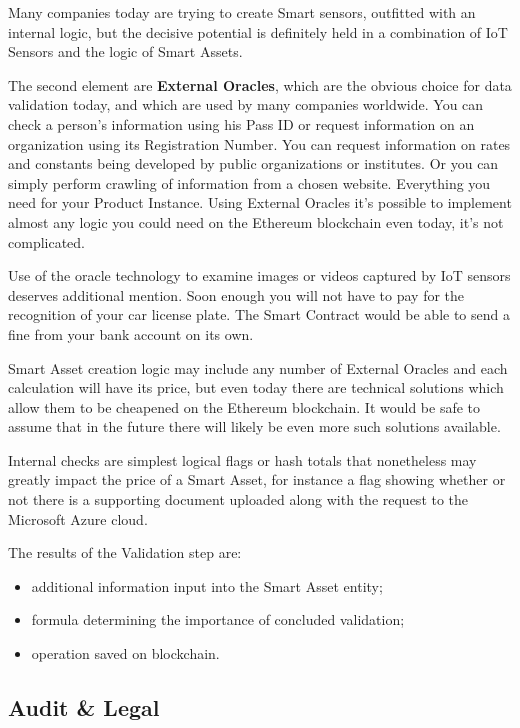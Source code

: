 \documentclass{article}
\begin{document}
\begin{multicols}{2}
Many companies today are trying to create Smart sensors, outfitted with an internal logic, but the decisive potential is definitely held in a combination of IoT Sensors and the logic of Smart Assets. 

The second element are \textbf{External Oracles}, which are the obvious choice for data validation today, and which are used by many companies worldwide. You can check a person’s information using his Pass ID or request information on an organization using its Registration Number. You can request information on rates and constants being developed by public organizations or institutes. Or you can simply perform crawling of information from a chosen website. Everything you need for your Product Instance. Using External Oracles it's possible to implement almost any logic you could need on the Ethereum blockchain even today, it's not complicated.

Use of the oracle technology to examine images or videos captured by IoT sensors deserves additional mention. Soon enough you will not have to pay for the recognition of your car license plate. The Smart Contract would be able to send a fine from your bank account on its own. 

Smart Asset creation logic may include any number of External Oracles and each calculation will have its price, but even today there are technical solutions which allow them to be cheapened on the Ethereum blockchain. It would be safe to assume that in the future there will likely be even more such solutions available.

Internal checks are simplest logical flags or hash totals that nonetheless may greatly impact the price of a Smart Asset, for instance a flag showing whether or not there is a supporting document uploaded along with the request to the Microsoft Azure cloud. 

The results of the Validation step are:

\begin{itemize}
\item additional information input into the Smart Asset entity;
\item formula determining the importance of concluded validation;
\item operation saved on blockchain.
\end{itemize}

\subsection{Audit \& Legal}


\end{multicols}
\end{document}
